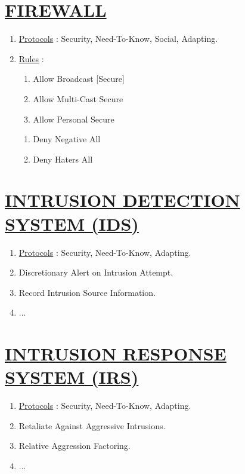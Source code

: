 \documentclass[11pt]{article}
\begin{document}
\section*{\ul{FIREWALL}}
\begin{enumerate}
	\item[] \ul{Protocols} : Security, Need-To-Know, Social, Adapting.

	\item[] \ul{Rules} :
	\begin{enumerate}
		\item[] Allow Broadcast [Secure]
		\item[] Allow Multi-Cast Secure
		\item[] Allow Personal Secure
	\end{enumerate}

	\begin{enumerate}
		\item[] Deny Negative All
		\item[] Deny Haters All
	\end{enumerate}
	
\end{enumerate}


\section*{\ul{INTRUSION DETECTION SYSTEM (IDS)}}
\begin{enumerate}
	\item[] \ul{Protocols} : Security, Need-To-Know, Adapting.
	\item[] Discretionary Alert on Intrusion Attempt.
	\item[] Record Intrusion Source Information.
	\item[] ...
\end{enumerate}


\section*{\ul{INTRUSION RESPONSE SYSTEM (IRS)}}
\begin{enumerate}
	\item[] \ul{Protocols} : Security, Need-To-Know, Adapting.
	\item[] Retaliate Against Aggressive Intrusions.
	\item[] Relative Aggression Factoring.
	\item[] ...
\end{enumerate}
\end{document}
